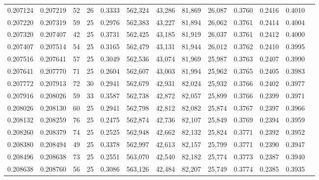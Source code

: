 \begin{tabular}{rrrrrrrrrrrrr}
0.207124 & 0.207219 &    52 &  26 &                                     0.3333 & 562,324 &  43,286 &  81,869 &  26,087 & 0.3760 & 0.2416 & 0.4010 \\
0.207220 & 0.207319 &    59 &  25 &                                     0.2976 & 562,383 &  43,227 &  81,894 &  26,062 & 0.3761 & 0.2414 & 0.4004 \\
0.207320 & 0.207407 &    42 &  25 &                                     0.3731 & 562,425 &  43,185 &  81,919 &  26,037 & 0.3761 & 0.2412 & 0.4000 \\
0.207407 & 0.207514 &    54 &  25 &                                     0.3165 & 562,479 &  43,131 &  81,944 &  26,012 & 0.3762 & 0.2410 & 0.3995 \\
0.207516 & 0.207641 &    57 &  25 &                                     0.3049 & 562,536 &  43,074 &  81,969 &  25,987 & 0.3763 & 0.2407 & 0.3990 \\
0.207641 & 0.207770 &    71 &  25 &                                     0.2604 & 562,607 &  43,003 &  81,994 &  25,962 & 0.3765 & 0.2405 & 0.3983 \\
0.207772 & 0.207913 &    72 &  30 &                                     0.2941 & 562,679 &  42,931 &  82,024 &  25,932 & 0.3766 & 0.2402 & 0.3977 \\
0.207916 & 0.208026 &    59 &  33 &                                     0.3587 & 562,738 &  42,872 &  82,057 &  25,899 & 0.3766 & 0.2399 & 0.3971 \\
0.208026 & 0.208130 &    60 &  25 &                                     0.2941 & 562,798 &  42,812 &  82,082 &  25,874 & 0.3767 & 0.2397 & 0.3966 \\
0.208132 & 0.208259 &    76 &  25 &                                     0.2475 & 562,874 &  42,736 &  82,107 &  25,849 & 0.3769 & 0.2394 & 0.3959 \\
0.208260 & 0.208379 &    74 &  25 &                                     0.2525 & 562,948 &  42,662 &  82,132 &  25,824 & 0.3771 & 0.2392 & 0.3952 \\
0.208380 & 0.208494 &    49 &  25 &                                     0.3378 & 562,997 &  42,613 &  82,157 &  25,799 & 0.3771 & 0.2390 & 0.3947 \\
0.208496 & 0.208638 &    73 &  25 &                                     0.2551 & 563,070 &  42,540 &  82,182 &  25,774 & 0.3773 & 0.2387 & 0.3940 \\
0.208638 & 0.208760 &    56 &  25 &                                     0.3086 & 563,126 &  42,484 &  82,207 &  25,749 & 0.3774 & 0.2385 & 0.3935 \\

\end{tabular}
